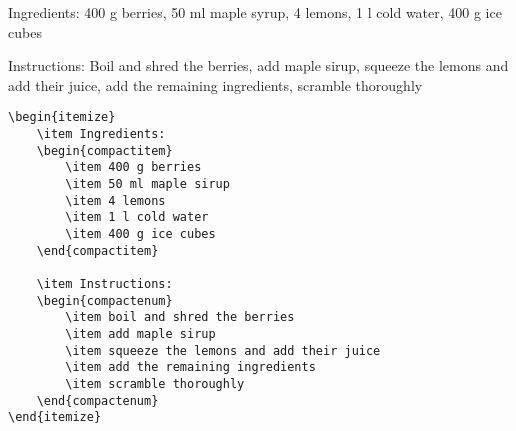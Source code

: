 Ingredients:
400 g berries, 50 ml maple syrup, 4 lemons, 1 l cold water, 400 g ice cubes

\noindent Instructions: Boil and shred the berries, add maple sirup, squeeze the lemons and add their juice, add the remaining ingredients, scramble thoroughly

\begin{verbatim}
\begin{itemize}
	\item Ingredients:
	\begin{compactitem}
		\item 400 g berries
		\item 50 ml maple sirup 
		\item 4 lemons
		\item 1 l cold water
		\item 400 g ice cubes
	\end{compactitem}

	\item Instructions:
	\begin{compactenum}
		\item boil and shred the berries
		\item add maple sirup
		\item squeeze the lemons and add their juice
		\item add the remaining ingredients
		\item scramble thoroughly
	\end{compactenum}
\end{itemize}
\end{verbatim}
